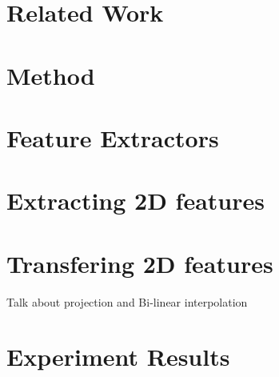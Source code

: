 \documentclass[10pt,twocolumn,letterpaper]{article}
\begin{document}
\section{Related Work}
\label{sec:relatedWork}


\section{Method}
\label{sec:method}

\section{Feature Extractors}
\label{sec:method:featuresExtractors}

\section{Extracting 2D features}
\label{sec:method:features2d}

\section{Transfering 2D features}
\label{sec:method:features2D3D}

Talk about projection and Bi-linear interpolation

\section{Experiment Results}
\label{sec:results}
\end{document}
